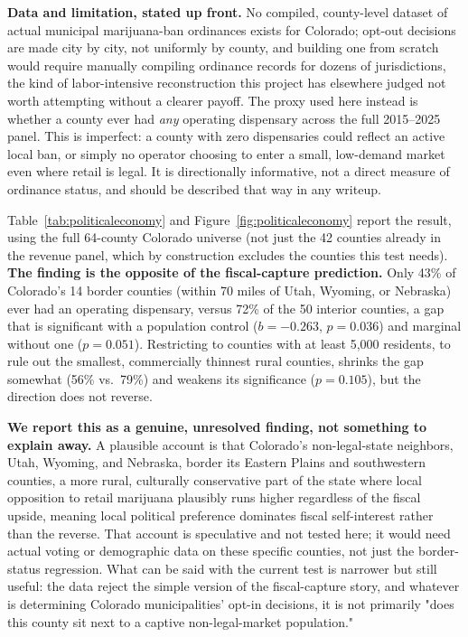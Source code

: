 \documentclass[11pt]{article}
\begin{document}
\textbf{Data and limitation, stated up front.} No compiled, county-level dataset of actual municipal
marijuana-ban ordinances exists for Colorado; opt-out decisions are made city by city, not uniformly by
county, and building one from scratch would require manually compiling ordinance records for dozens of
jurisdictions, the kind of labor-intensive reconstruction this project has elsewhere judged not worth
attempting without a clearer payoff. The proxy used here instead is whether a county ever had \emph{any}
operating dispensary across the full 2015--2025 panel. This is imperfect: a county with zero dispensaries
could reflect an active local ban, or simply no operator choosing to enter a small, low-demand market even
where retail is legal. It is directionally informative, not a direct measure of ordinance status, and
should be described that way in any writeup.

Table~\ref{tab:politicaleconomy} and Figure~\ref{fig:politicaleconomy} report the result, using the full
64-county Colorado universe (not just the 42 counties already in the revenue panel, which by construction
excludes the counties this test needs). \textbf{The finding is the opposite of the fiscal-capture
prediction.} Only 43\% of Colorado's 14 border counties (within 70 miles of Utah, Wyoming, or Nebraska)
ever had an operating dispensary, versus 72\% of the 50 interior counties, a gap that is significant with
a population control ($b=-0.263$, $p=0.036$) and marginal without one ($p=0.051$). Restricting to counties
with at least 5{,}000 residents, to rule out the smallest, commercially thinnest rural counties, shrinks
the gap somewhat (56\% vs.\ 79\%) and weakens its significance ($p=0.105$), but the direction does not
reverse.

\textbf{We report this as a genuine, unresolved finding, not something to explain away.} A plausible
account is that Colorado's non-legal-state neighbors, Utah, Wyoming, and Nebraska, border its Eastern
Plains and southwestern counties, a more rural, culturally conservative part of the state where local
opposition to retail marijuana plausibly runs higher regardless of the fiscal upside, meaning local
political preference dominates fiscal self-interest rather than the reverse. That account is speculative
and not tested here; it would need actual voting or demographic data on these specific counties, not just
the border-status regression. What can be said with the current test is narrower but still useful: the
data reject the simple version of the fiscal-capture story, and whatever is determining Colorado
municipalities' opt-in decisions, it is not primarily "does this county sit next to a captive
non-legal-market population."
\end{document}
